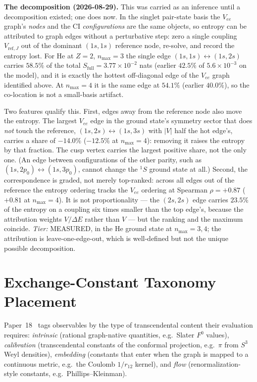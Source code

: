 \documentclass[twocolumn,pra,amsmath,amssymb,superscriptaddress]{revtex4-2}
\begin{document}
\textbf{The decomposition (2026-08-29).}  This was carried as an
inference until a decomposition existed; one does now.  In the singlet
pair-state basis the $V_{ee}$ graph's \emph{nodes} and the CI
\emph{configurations} are the same objects, so entropy can be
attributed to graph edges without a perturbative step: zero a single
coupling $V_{\text{ref},J}$ out of the dominant $(1s,1s)$ reference
node, re-solve, and record the entropy lost.  For He at $Z=2$,
$n_{\max}=3$ the single edge
$(1s,1s)\leftrightarrow(1s,2s)$ carries $58.5\%$ of the total
$S_{\text{full}} = 3.77\times10^{-2}$ nats (earlier $42.5\%$ of
$5.6\times10^{-3}$ on the model), and it is exactly the
hottest off-diagonal edge of the $V_{ee}$ graph identified above.  At
$n_{\max}=4$ it is the same edge at $54.1\%$ (earlier $40.0\%$), so the
co-location is not a small-basis artifact.

Two features qualify this.  First, edges away from the reference
node also move the entropy.  The largest $V_{ee}$ edge in the ground
state's symmetry sector that does \emph{not} touch the reference,
$(1s,2s)\leftrightarrow(1s,3s)$ with $|V|$ half the hot edge's,
carries a share of $-14.0\%$ ($-12.5\%$ at $n_{\max}=4$): removing it
raises the entropy by that fraction.  The cusp vertex carries the
largest positive share, not the only one.  (An edge between configurations of
the other parity, such as $(1s,2p_0)\leftrightarrow(1s,3p_0)$, cannot
change the ${}^1S$ ground state at all.)  Second, the correspondence
is graded, not merely top-ranked: across all edges out of the
reference the entropy ordering tracks the $V_{ee}$ ordering at
Spearman $\rho = +0.87$ ($+0.81$ at $n_{\max}=4$).  It is not
proportionality --- the $(2s,2s)$ edge carries $23.5\%$ of the entropy
on a coupling six times smaller than the top edge's, because the
attribution weights $V/\Delta E$ rather than $V$ --- but the ranking
and the maximum coincide.  \emph{Tier:} MEASURED, in the He ground
state at $n_{\max} = 3, 4$; the attribution is leave-one-edge-out,
which is well-defined but not the unique possible decomposition.

\section{Exchange-Constant Taxonomy Placement}
\label{sec:taxonomy}

Paper~18~\cite{GeoVac_Paper18} tags observables by the
type of transcendental content their evaluation requires:
\emph{intrinsic} (rational graph-native quantities, e.g.\ Slater
$F^{0}$ values), \emph{calibration} (transcendental constants of
the conformal projection, e.g.\ $\pi$ from $S^{3}$ Weyl
densities), \emph{embedding} (constants that enter when the
graph is mapped to a continuous metric, e.g.\ the Coulomb
$1/r_{12}$ kernel), and \emph{flow} (renormalization-style
constants, e.g.\ Phillips--Kleinman).
\end{document}

